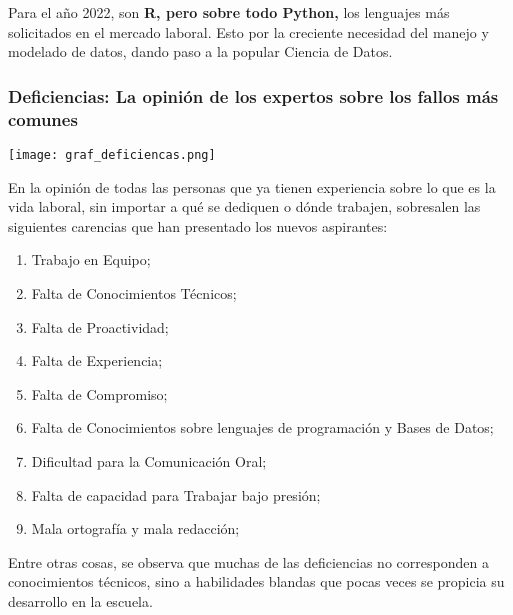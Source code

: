 \documentclass{article}
\begin{document}
Para el año 2022, son \textbf{R, pero sobre todo Python,} los lenguajes más solicitados en el mercado laboral. Esto por la creciente necesidad del manejo y modelado de datos, dando paso a la popular Ciencia de Datos. 



\subsubsection{Deficiencias: La opinión de los expertos sobre los fallos más comunes}

\begin{center}
    \texttt{[image: graf\_deficiencas.png]}
\end{center}

En la opinión de todas las personas que ya tienen experiencia sobre lo que es la vida laboral, sin importar a qué se dediquen o dónde trabajen, sobresalen las siguientes carencias que han presentado los nuevos aspirantes:

\begin{enumerate}
    \item Trabajo en Equipo;
    
    \item Falta de Conocimientos Técnicos;
    
    \item Falta de Proactividad;
    
    \item Falta de Experiencia;
    
    \item Falta de Compromiso;
    
    \item Falta de Conocimientos sobre lenguajes de programación y Bases de Datos;
    
    \item Dificultad para la Comunicación Oral;
    
    \item Falta de capacidad para Trabajar bajo presión;
    
    \item Mala ortografía y mala redacción;

\end{enumerate}

Entre otras cosas, se observa que muchas de las deficiencias no corresponden a conocimientos técnicos, sino a habilidades blandas que pocas veces se propicia su desarrollo en la escuela. 
\end{document}
